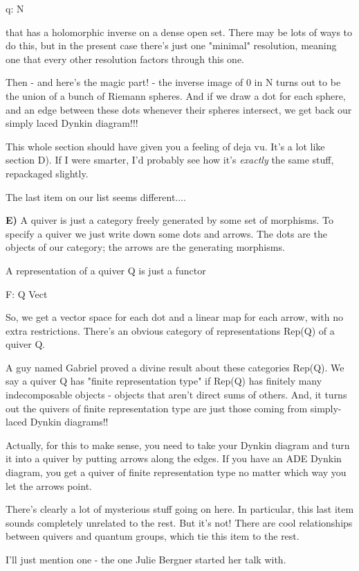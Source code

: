 q: N 

that has a holomorphic inverse on a dense open set.  There may be 
lots of ways to do this, but in the present case there's just one 
"minimal" resolution, meaning one that every other resolution 
factors through this one.

Then - and here's the magic part! - the inverse image of 0 in N
turns out to be the union of a bunch of Riemann spheres.  And
if we draw a dot for each sphere, and an edge between these dots 
whenever their spheres intersect, we get back our simply laced
Dynkin diagram!!!

This whole section should have given you a feeling of deja vu.
It's a lot like section D).  If I were smarter, I'd probably see 
how it's \emph{exactly} the same stuff, repackaged slightly.  

The last item on our list seems different....

\textbf{E)} A quiver is just a category freely generated by some set of
morphisms.  To specify a quiver we just write down some dots
and arrows.  The dots are the objects of our category; the 
arrows are the generating morphisms.

A representation of a quiver Q is just a functor 

F: Q \to  Vect

So, we get a vector space for each dot and a linear map for
each arrow, with no extra restrictions.  There's an obvious
category of representations Rep(Q) of a quiver Q.

A guy named Gabriel proved a divine result about these categories
Rep(Q).  We say a quiver Q has "finite representation type"
if Rep(Q) has finitely many indecomposable objects - objects that
aren't direct sums of others.  And, it turns out the quivers of
finite representation type are just those coming from simply-laced
Dynkin diagrams!!

Actually, for this to make sense, you need to take your Dynkin diagram
and turn it into a quiver by putting arrows along the edges.  If you
have an ADE Dynkin diagram, you get a quiver of finite representation
type no matter which way you let the arrows point.

There's clearly a lot of mysterious stuff going on here.  In
particular, this last item sounds completely unrelated to the 
rest.  But it's not!  There are cool relationships between quivers
and quantum groups, which tie this item to the rest.

I'll just mention one - the one Julie Bergner started her talk with.

